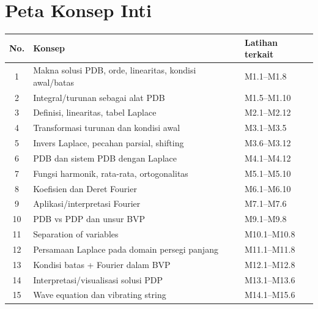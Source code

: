 \documentclass[10pt,a4paper]{article}
\begin{document}
\section*{Peta Konsep Inti}
\begin{infobox}[title={Konsep yang harus dikuasai untuk menempuh UTS hingga UAS},colbacktitle=iteraBlue2,coltitle=white,fonttitle=\bfseries]
\small
\begin{tabularx}{\textwidth}{@{}c X X@{}}
\toprule
\textbf{No.}&\textbf{Konsep}&\textbf{Latihan terkait}\\\midrule
1&Makna solusi PDB, orde, linearitas, kondisi awal/batas&M1.1--M1.8\\
2&Integral/turunan sebagai alat PDB&M1.5--M1.10\\
3&Definisi, linearitas, tabel Laplace&M2.1--M2.12\\
4&Transformasi turunan dan kondisi awal&M3.1--M3.5\\
5&Invers Laplace, pecahan parsial, shifting&M3.6--M3.12\\
6&PDB dan sistem PDB dengan Laplace&M4.1--M4.12\\
7&Fungsi harmonik, rata-rata, ortogonalitas&M5.1--M5.10\\
8&Koefisien dan Deret Fourier&M6.1--M6.10\\
9&Aplikasi/interpretasi Fourier&M7.1--M7.6\\
10&PDB vs PDP dan unsur BVP&M9.1--M9.8\\
11&Separation of variables&M10.1--M10.8\\
12&Persamaan Laplace pada domain persegi panjang&M11.1--M11.8\\
13&Kondisi batas + Fourier dalam BVP&M12.1--M12.8\\
14&Interpretasi/visualisasi solusi PDP&M13.1--M13.6\\
15&Wave equation dan vibrating string&M14.1--M15.6\\
\bottomrule
\end{tabularx}
\end{infobox}
\end{document}
